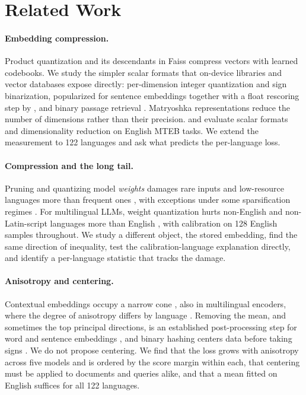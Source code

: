 \documentclass[11pt]{article}
\begin{document}
\section{Related Work}
\paragraph{Embedding compression.} Product quantization \citep{jegou2011pq} and its descendants in Faiss \citep{johnson2019faiss} compress vectors with learned codebooks. We study the simpler scalar formats that on-device libraries and vector databases expose directly: per-dimension integer quantization and sign binarization, popularized for sentence embeddings together with a float rescoring step by \citet{shakir2024quant}, and binary passage retrieval \citep{yamada2021bpr}. Matryoshka representations \citep{kusupati2022matryoshka} reduce the number of dimensions rather than their precision. \citet{sanchez2025storage} and \citet{dimquant2026} evaluate scalar formats and dimensionality reduction on English MTEB tasks. We extend the measurement to 122 languages and ask what predicts the per-language loss.

\paragraph{Compression and the long tail.} Pruning and quantizing model \emph{weights} damages rare inputs and low-resource languages more than frequent ones \citep{hooker2020bias,ahia2021doublebind}, with exceptions under some sparsification regimes \citep{ogueji2022intriguing}. For multilingual LLMs, weight quantization hurts non-English and non-Latin-script languages more than English \citep{marchisio2024quantization,mekala2025longcontext}, with calibration on 128 English samples throughout. We study a different object, the stored embedding, find the same direction of inequality, test the calibration-language explanation directly, and identify a per-language statistic that tracks the damage.

\paragraph{Anisotropy and centering.} Contextual embeddings occupy a narrow cone \citep{ethayarajh2019contextual,gao2019representation}, also in multilingual encoders, where the degree of anisotropy differs by language \citep{rajaee2022isotropy,hammerl2023anisotropy}. Removing the mean, and sometimes the top principal directions, is an established post-processing step for word and sentence embeddings \citep{mu2018allbutthetop,li2020bertflow,su2021whitening}, and binary hashing centers data before taking signs \citep{gong2011itq}. We do not propose centering. We find that the loss grows with anisotropy across five models and is ordered by the score margin within each, that centering must be applied to documents and queries alike, and that a mean fitted on English suffices for all 122 languages.
\end{document}
